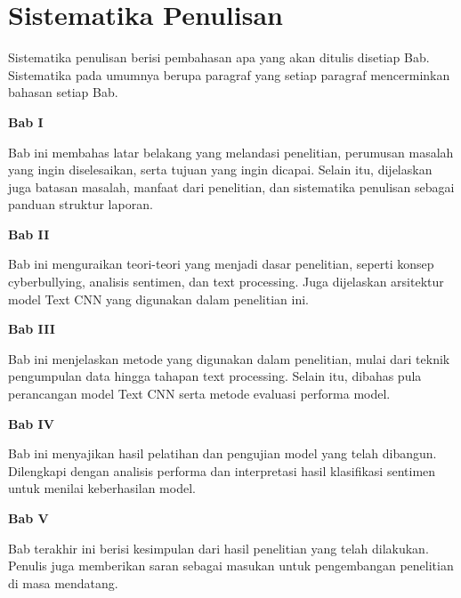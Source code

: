\section{Sistematika Penulisan} \label{I.Sistematika}
Sistematika penulisan berisi pembahasan apa yang akan ditulis disetiap Bab. Sistematika pada umumnya berupa paragraf yang setiap paragraf mencerminkan bahasan setiap Bab. \par

\noindent\textbf{Bab I}

Bab ini membahas latar belakang yang melandasi penelitian, perumusan masalah yang ingin diselesaikan, serta tujuan yang ingin dicapai. Selain itu, dijelaskan juga batasan masalah, manfaat dari penelitian, dan sistematika penulisan sebagai panduan struktur laporan.

\noindent\textbf{Bab II}

Bab ini menguraikan teori-teori yang menjadi dasar penelitian, seperti konsep cyberbullying, analisis sentimen, dan text processing. Juga dijelaskan arsitektur model Text CNN yang digunakan dalam penelitian ini.

\noindent\textbf{Bab III}

Bab ini menjelaskan metode yang digunakan dalam penelitian, mulai dari teknik pengumpulan data hingga tahapan text processing. Selain itu, dibahas pula perancangan model Text CNN serta metode evaluasi performa model.

\noindent\textbf{Bab IV}

Bab ini menyajikan hasil pelatihan dan pengujian model yang telah dibangun. Dilengkapi dengan analisis performa dan interpretasi hasil klasifikasi sentimen untuk menilai keberhasilan model.

\noindent\textbf{Bab V}

Bab terakhir ini berisi kesimpulan dari hasil penelitian yang telah dilakukan. Penulis juga memberikan saran sebagai masukan untuk pengembangan penelitian di masa mendatang.